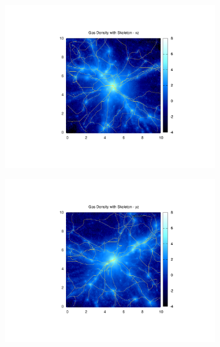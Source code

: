 \documentclass[journal]{IEEEtran}
\begin{document}
\begin{figure}[!t]
\begin{subfigure}[t]{0.3\textwidth}
		\includegraphics[width=\linewidth]{GasDenSkelxz.pdf}
	\end{subfigure}
	\quad
	\begin{subfigure}[t]{0.3\textwidth}
		\centering
		\includegraphics[width=\linewidth]{GasDenSkelyz.pdf}
	\end{subfigure}
	\\
	\begin{subfigure}[t]{0.3\textwidth}
		\centering

\end{subfigure}
\end{figure}
\end{document}
